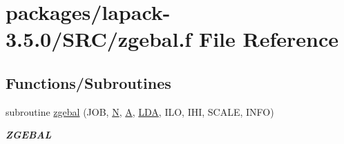 \hypertarget{zgebal_8f}{}\section{packages/lapack-\/3.5.0/\+S\+R\+C/zgebal.f File Reference}
\label{zgebal_8f}
\subsection*{Functions/\+Subroutines}
\begin{DoxyCompactItemize}
\item 
subroutine \hyperlink{group__complex16GEcomputational_ga4861b77e1503bc61f2946cadc1fe5128}{zgebal} (J\+O\+B, \hyperlink{polmisc_8c_a0240ac851181b84ac374872dc5434ee4}{N}, \hyperlink{classA}{A}, \hyperlink{example__user_8c_ae946da542ce0db94dced19b2ecefd1aa}{L\+D\+A}, I\+L\+O, I\+H\+I, S\+C\+A\+L\+E, I\+N\+F\+O)
\begin{DoxyCompactList}\small\item\em {\bfseries Z\+G\+E\+B\+A\+L} \end{DoxyCompactList}\end{DoxyCompactItemize}
